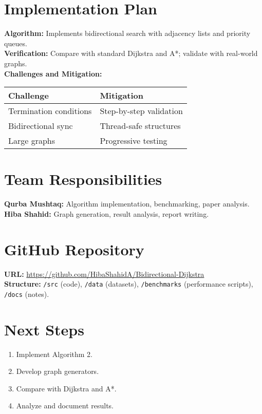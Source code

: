 \documentclass[10pt]{article}
\begin{document}
\section*{Implementation Plan}
\textbf{Algorithm:} Implements bidirectional search with adjacency lists and priority queues.\\
\textbf{Verification:} Compare with standard Dijkstra and A*; validate with real-world graphs.\\
\textbf{Challenges and Mitigation:}\\
\begin{tabular}{p{6cm}|p{6cm}}
\toprule
\textbf{Challenge} & \textbf{Mitigation} \\
\midrule
Termination conditions & Step-by-step validation \\
Bidirectional sync & Thread-safe structures \\
Large graphs & Progressive testing \\
\bottomrule
\end{tabular}

\section*{Team Responsibilities}
\textbf{Qurba Mushtaq:} Algorithm implementation, benchmarking, paper analysis.\\
\textbf{Hiba Shahid:} Graph generation, result analysis, report writing.

\section*{GitHub Repository}
\textbf{URL:} \url{https://github.com/HibaShahidA/Bidirectional-Dijkstra}\\
\textbf{Structure:} \texttt{/src} (code), \texttt{/data} (datasets), \texttt{/benchmarks} (performance scripts), \texttt{/docs} (notes).

\section*{Next Steps}
\begin{enumerate}
    \item Implement Algorithm 2.
    \item Develop graph generators.
    \item Compare with Dijkstra and A*.
    \item Analyze and document results.
\end{enumerate}
\end{document}
